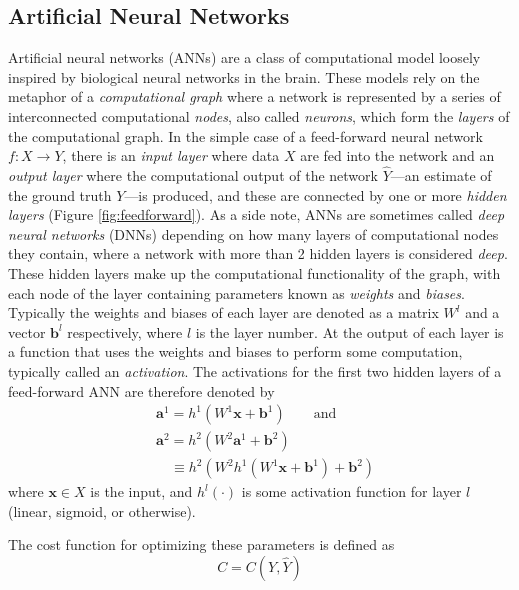 \documentclass[11pt,a4paper,oneside]{article}
\begin{document}
\begin{appendices}
\section{Artificial Neural Networks}  \label{sec:anns}
Artificial neural networks (ANNs) are a class of computational model loosely inspired by biological neural networks in the brain. These models rely on the metaphor of a \textit{computational graph} where a network is represented by a series of interconnected computational \textit{nodes}, also called \textit{neurons}, which form the \textit{layers} of the computational graph. In the simple case of a feed-forward neural network $f: X \to Y$, there is an \textit{input layer} where data $X$ are fed into the network and an \textit{output layer} where the computational output of the network $\hat{Y}$---an estimate of the ground truth $Y$---is produced, and these are connected by one or more \textit{hidden layers} (Figure \ref{fig:feedforward}). As a side note, ANNs are sometimes called \textit{deep neural networks} (DNNs) depending on how many layers of computational nodes they contain, where a network with more than 2 hidden layers is considered \textit{deep}. These hidden layers make up the computational functionality of the graph, with each node of the layer containing parameters known as \textit{weights} and \textit{biases}. Typically the weights and biases of each layer are denoted as a matrix $W^l$ and a vector $\mathbf{b}^l$ respectively, where $l$ is the layer number. At the output of each layer is a function that uses the weights and biases to perform some computation, typically called an \textit{activation}. The activations for the first two hidden layers of a feed-forward ANN are therefore denoted by
\begin{equation}
\begin{aligned}
& \mathbf{a}^1 = h^{1}(W^1\mathbf{x} + \mathbf{b}^1)  \qquad \text{and}\\
& \mathbf{a}^2 = h^{2}(W^2\mathbf{a}^1 + \mathbf{b}^2)\\
& \quad \equiv h^2(W^2h^1(W^1\mathbf{x} + \mathbf{b}^1) + \mathbf{b}^2) 
\end{aligned}
\end{equation}
where $\mathbf{x} \in X$ is the input, and $h^{l}(\cdot)$ is some activation function for layer $l$ (linear, sigmoid, or otherwise). 
\par
The cost function for optimizing these parameters is defined as 
\begin{equation}
C = C(Y,\hat{Y})
\end{equation}

\end{appendices}
\end{document}
